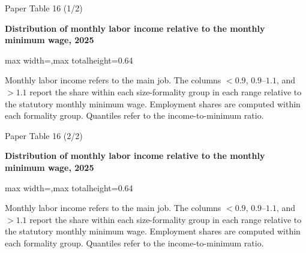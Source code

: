 \begin{frame}{Paper Table 16 (1/2)}
\begin{minipage}{\textwidth}\small\textbf{Distribution of monthly labor income relative to the monthly minimum wage, 2025}\end{minipage}\par\vspace{0.15cm}
\centering\begingroup\fontsize{8.5}{10}\selectfont
\setlength{\tabcolsep}{4pt}\renewcommand{\arraystretch}{1.06}
\begin{adjustbox}{max width=\textwidth,max totalheight=0.64\textheight}

\end{adjustbox}\endgroup\par\vspace{0.10cm}
{\fontsize{6.5}{7.5}\selectfont\raggedright Monthly labor income refers to the main job. The columns $<0.9$, $0.9$--$1.1$, and $>1.1$ report the share within each size-formality group in each range relative to the statutory monthly minimum wage. Employment shares are computed within each formality group. Quantiles refer to the income-to-minimum ratio.\par}
\end{frame}

\begin{frame}{Paper Table 16 (2/2)}
\begin{minipage}{\textwidth}\small\textbf{Distribution of monthly labor income relative to the monthly minimum wage, 2025}\end{minipage}\par\vspace{0.15cm}
\centering\begingroup\fontsize{8.5}{10}\selectfont
\setlength{\tabcolsep}{4pt}\renewcommand{\arraystretch}{1.06}
\begin{adjustbox}{max width=\textwidth,max totalheight=0.64\textheight}

\end{adjustbox}\endgroup\par\vspace{0.10cm}
{\fontsize{6.5}{7.5}\selectfont\raggedright Monthly labor income refers to the main job. The columns $<0.9$, $0.9$--$1.1$, and $>1.1$ report the share within each size-formality group in each range relative to the statutory monthly minimum wage. Employment shares are computed within each formality group. Quantiles refer to the income-to-minimum ratio.\par}
\end{frame}


